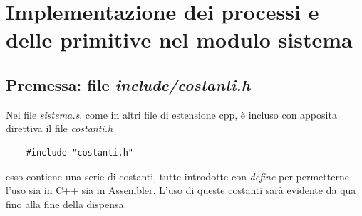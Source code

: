 
\chapter{Implementazione dei processi e delle primitive nel modulo sistema}

\section{Premessa: file \emph{include/costanti.h}}
Nel file \emph{sistema.s}, come in altri file di estensione cpp, è incluso con apposita direttiva il file \emph{costanti.h}
\begin{verbatim}
	#include "costanti.h"
\end{verbatim}
esso contiene una serie di costanti, tutte introdotte con \emph{define} per permetterne l'uso sia in C++ sia in Assembler. L'uso di queste costanti sarà evidente da qua fino alla fine della dispensa.

